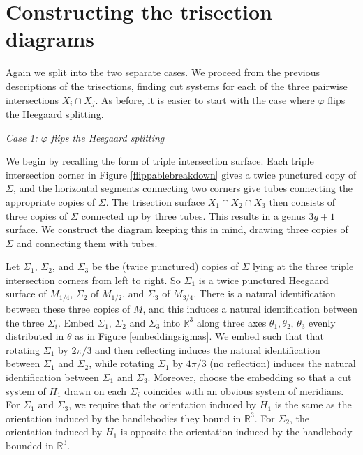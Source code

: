 \documentclass[12pt]{amsart}
\newcommand{\R}{\mathbb{R}}
\theoremstyle{definition}
\theoremstyle{remark}
\begin{document}
\section{Constructing the trisection diagrams}
\label{sec_diagrams}

Again we split into the two separate cases.  We proceed from the previous descriptions of the trisections, finding cut systems for each of the three pairwise intersections $X_i \cap X_j$.  As before, it is easier to start with the case where $\varphi$ flips the Heegaard splitting.

\smallskip
\noindent\textit{Case 1: $\varphi$ flips the Heegaard splitting}\ \ 

We begin by recalling the form of triple intersection surface.  Each triple intersection corner in Figure \ref{flippablebreakdown} gives a twice punctured copy of $\Sigma$, and the horizontal segments connecting two corners give tubes connecting the appropriate copies of $\Sigma$.  The trisection surface $X_1 \cap X_2 \cap X_3$ then consists of three copies of $\Sigma$ connected up by three tubes.  This results in a genus $3g+1$ surface.  We construct the diagram keeping this in mind, drawing three copies of $\Sigma$ and connecting them with tubes.  

Let $\Sigma_1$, $\Sigma_2$, and $\Sigma_3$ be the (twice punctured) copies of $\Sigma$ lying at the three triple intersection corners from left to right.  So $\Sigma_1$ is a twice punctured Heegaard surface of $M_{1/4}$, $\Sigma_2$ of $M_{1/2}$, and $\Sigma_3$ of $M_{3/4}$.   There is a natural identification between these three copies of $M$, and this induces a natural identification between the three $\Sigma_i$.  Embed $\Sigma_1$, $\Sigma_2$ and $\Sigma_3$ into $\R^3$ along three axes $\theta_1,\theta_2$, $\theta_3$ evenly distributed in $\theta$ as in Figure \ref{embeddingsigmas}.  We embed such that that rotating $\Sigma_1$ by $2\pi/3$ and then reflecting induces the natural identification between $\Sigma_1$ and $\Sigma_2$, while rotating $\Sigma_1$ by $4\pi/3$ (no reflection) induces the natural identification between $\Sigma_1$ and $\Sigma_3$.  Moreover, choose the embedding so that a cut system of $H_1$ drawn on each $\Sigma_i$ coincides with an obvious system of meridians.  For $\Sigma_1$ and $\Sigma_3$, we require that the orientation induced by $H_1$ is the same as the orientation induced by the handlebodies they bound in $\R^3$.  For $\Sigma_2$, the orientation induced by $H_1$ is opposite the orientation induced by the handlebody bounded in $\R^3$.
\end{document}
